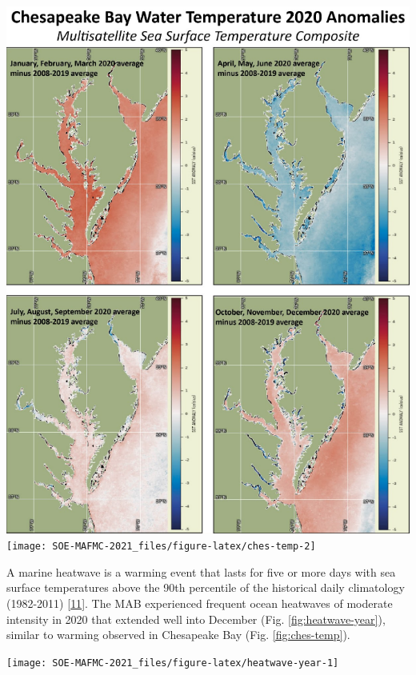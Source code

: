 \documentclass[
  10pt,
]{article}
\let\origfigure\figure
\let\endorigfigure\endfigure
\renewenvironment{figure}[1][2] {
    \expandafter\origfigure\expandafter[H]
} {
    \endorigfigure
}
\begin{document}
\begin{figure}
\includegraphics[width=0.49\linewidth]{images/ches-temp-temp} \texttt{[image: SOE-MAFMC-2021\_files/figure-latex/ches-temp-2]} \caption{Left panel: Chesapeake Bay sea surface temperature (SST) seasonal spatial anomalies for 2020, from NOAA multisatellite SST composite. Positive values (red) above 2008-2019 average; negative values (blue) below 2008-2019 average. A) Jan, Feb, Mar; B) Apr, May, Jun; C) Jul, Aug, Sep; D) Oct, Nov, Dec. Right panel: NOAA Chesapeake Bay Interpretive Buoy System Gooses Reef bouy sea water temperature; Blue = 2020, red = Long term average 2010-2019.}\label{fig:ches-temp}
\end{figure}

A marine heatwave is a warming event that lasts for five or more days
with sea surface temperatures above the 90th percentile of the
historical daily climatology (1982-2011)
{[}\protect\hyperlink{ref-hobday_hierarchical_2016}{11}{]}. The MAB
experienced frequent ocean heatwaves of moderate intensity in 2020 that
extended well into December (Fig. \ref{fig:heatwave-year}), similar to
warming observed in Chesapeake Bay (Fig. \ref{fig:ches-temp}).

\begin{figure}

{\centering \texttt{[image: SOE-MAFMC-2021\_files/figure-latex/heatwave-year-1]} 

}

\caption{Marine heatwave events (red) in the Mid-Atlantic occuring in 2020.}\label{fig:heatwave-year}
\end{figure}
\end{document}
